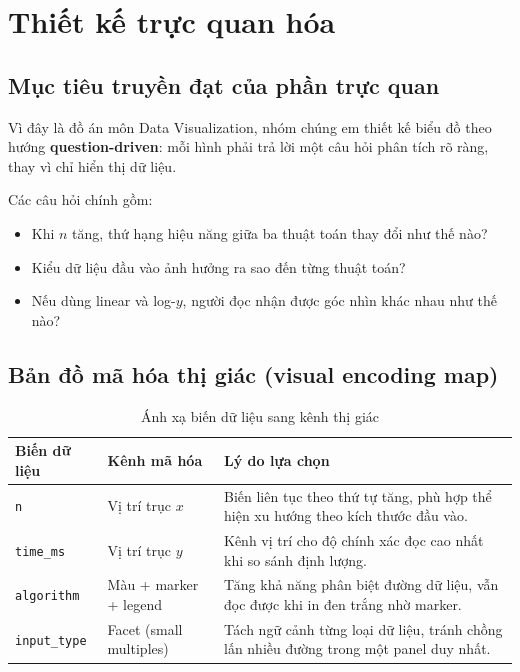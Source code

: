 \section{Thiết kế trực quan hóa}

\subsection{Mục tiêu truyền đạt của phần trực quan}

Vì đây là đồ án môn Data Visualization, nhóm chúng em thiết kế biểu đồ theo hướng
\textbf{question-driven}: mỗi hình phải trả lời một câu hỏi phân tích rõ ràng, thay vì chỉ hiển thị dữ liệu.

Các câu hỏi chính gồm:
\begin{itemize}[leftmargin=1.2cm]
    \item Khi $n$ tăng, thứ hạng hiệu năng giữa ba thuật toán thay đổi như thế nào?
    \item Kiểu dữ liệu đầu vào ảnh hưởng ra sao đến từng thuật toán?
    \item Nếu dùng linear và log-$y$, người đọc nhận được góc nhìn khác nhau như thế nào?
\end{itemize}

\subsection{Bản đồ mã hóa thị giác (visual encoding map)}

\begin{table}[H]
\centering
\renewcommand{\arraystretch}{1.2}
\begin{tabular}{p{3.0cm}p{3.0cm}p{7.6cm}}
\toprule
\textbf{Biến dữ liệu} & \textbf{Kênh mã hóa} & \textbf{Lý do lựa chọn} \\
\midrule
\texttt{n} & Vị trí trục $x$ & Biến liên tục theo thứ tự tăng, phù hợp thể hiện xu hướng theo kích thước đầu vào. \\
\texttt{time\_ms} & Vị trí trục $y$ & Kênh vị trí cho độ chính xác đọc cao nhất khi so sánh định lượng. \\
\texttt{algorithm} & Màu + marker + legend & Tăng khả năng phân biệt đường dữ liệu, vẫn đọc được khi in đen trắng nhờ marker. \\
\texttt{input\_type} & Facet (small multiples) & Tách ngữ cảnh từng loại dữ liệu, tránh chồng lấn nhiều đường trong một panel duy nhất. \\
\bottomrule
\end{tabular}
\caption{Ánh xạ biến dữ liệu sang kênh thị giác}
\label{tab:visual-encoding-map}
\end{table}

